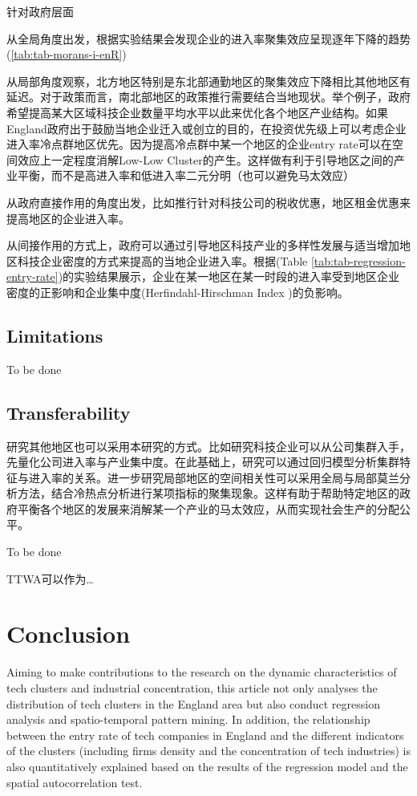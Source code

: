 \documentclass[
  12pt,
  oneside]{book}
\begin{document}
针对政府层面

从全局角度出发，根据实验结果会发现企业的进入率聚集效应呈现逐年下降的趋势 (\ref{tab:tab-morans-i-enR})

从局部角度观察，北方地区特别是东北部通勤地区的聚集效应下降相比其他地区有延迟。对于政策而言，南北部地区的政策推行需要结合当地现状。举个例子，政府希望提高某大区域科技企业数量平均水平以此来优化各个地区产业结构。如果England政府出于鼓励当地企业迁入或创立的目的，在投资优先级上可以考虑企业进入率冷点群地区优先。因为提高冷点群中某一个地区的企业entry rate可以在空间效应上一定程度消解Low-Low Cluster的产生。这样做有利于引导地区之间的产业平衡，而不是高进入率和低进入率二元分明（也可以避免马太效应）

从政府直接作用的角度出发，比如推行针对科技公司的税收优惠，地区租金优惠来提高地区的企业进入率。

从间接作用的方式上，政府可以通过引导地区科技产业的多样性发展与适当增加地区科技企业密度的方式来提高的当地企业进入率。根据(Table \ref{tab:tab-regression-entry-rate})的实验结果展示，企业在某一地区在某一时段的进入率受到地区企业密度的正影响和企业集中度(Herfindahl-Hirschman Index )的负影响。

\hypertarget{limitations-1}{%
\section{Limitations}\label{limitations-1}}

To be done

\hypertarget{transferability}{%
\section{Transferability}\label{transferability}}

研究其他地区也可以采用本研究的方式。比如研究科技企业可以从公司集群入手，先量化公司进入率与产业集中度。在此基础上，研究可以通过回归模型分析集群特征与进入率的关系。进一步研究局部地区的空间相关性可以采用全局与局部莫兰分析方法，结合冷热点分析进行某项指标的聚集现象。这样有助于帮助特定地区的政府平衡各个地区的发展来消解某一个产业的马太效应，从而实现社会生产的分配公平。

To be done

TTWA可以作为\ldots{}

\hypertarget{conclusion-1}{%
\chapter{Conclusion}\label{conclusion-1}}

Aiming to make contributions to the research on the dynamic characteristics of tech clusters and industrial concentration, this article not only analyses the distribution of tech clusters in the England area but also conduct regression analysis and spatio-temporal pattern mining. In addition, the relationship between the entry rate of tech companies in England and the different indicators of the clusters (including firms density and the concentration of tech industries) is also quantitatively explained based on the results of the regression model and the spatial autocorrelation test.
\end{document}
